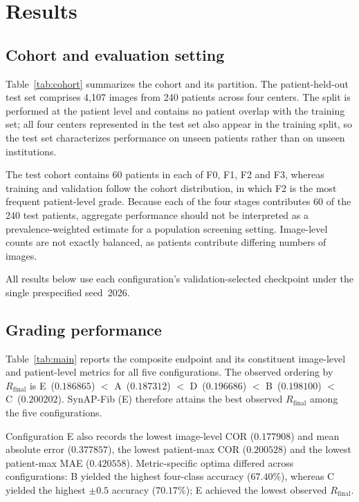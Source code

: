 \section{Results}
\label{sec:results}

\subsection{Cohort and evaluation setting}

Table~\ref{tab:cohort} summarizes the cohort and its partition. The
patient-held-out test set comprises 4,107 images from 240 patients across four
centers. The split is performed at the patient level and contains no patient
overlap with the training set; all four centers represented in the test set
also appear in the training split, so the test set characterizes performance
on unseen patients rather than on unseen institutions.

The test cohort contains 60 patients in each of F0, F1, F2 and F3, whereas
training and validation follow the cohort distribution, in which F2 is the most
frequent patient-level grade. Because each of the four stages contributes 60 of
the 240 test patients, aggregate performance should not be interpreted as a
prevalence-weighted estimate for a population screening setting. Image-level
counts are not exactly balanced, as patients contribute differing numbers of
images.

All results below use each configuration's validation-selected checkpoint
under the single prespecified seed~2026.

\subsection{Grading performance}

Table~\ref{tab:main} reports the composite endpoint and its constituent
image-level and patient-level metrics for all five configurations. The observed
ordering by $R_{\mathrm{final}}$ is
E~($0.186865$) $<$ A~($0.187312$) $<$ D~($0.196686$) $<$ B~($0.198100$) $<$
C~($0.200202$). SynAP-Fib (E) therefore attains the best observed
$R_{\mathrm{final}}$ among the five configurations.

Configuration E also records the lowest image-level COR ($0.177908$) and mean
absolute error ($0.377857$), the lowest patient-max COR ($0.200528$) and the
lowest patient-max MAE ($0.420558$). Metric-specific optima differed across
configurations: B yielded the highest four-class accuracy ($67.40\%$), whereas
C yielded the highest $\pm0.5$ accuracy ($70.17\%$); E achieved the lowest
observed $R_{\mathrm{final}}$.

